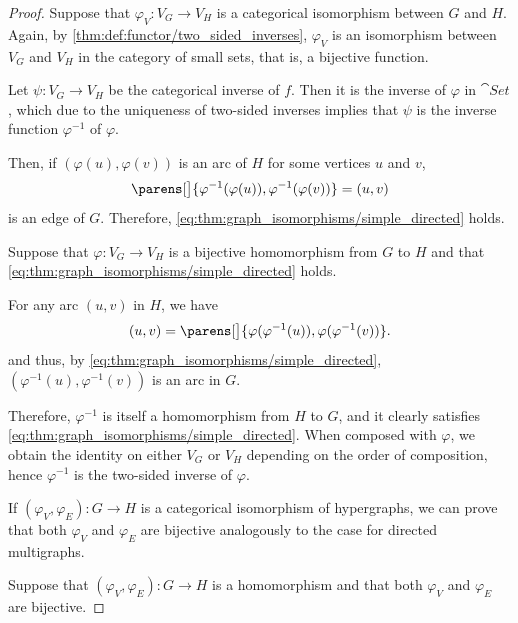 \begin{proof}
  \SufficiencySubProof* Suppose that \( \varphi_V: V_G \to V_H \) is a categorical isomorphism between \( G \) and \( H \). Again, by \cref{thm:def:functor/two_sided_inverses}, \( \varphi_V \) is an isomorphism between \( V_G \) and \( V_H \) in the category of small sets, that is, a bijective function.

  Let \( \psi: V_G \to V_H \) be the categorical inverse of \( f \). Then it is the inverse of \( \varphi \) in \( \cat{Set} \), which due to the uniqueness of two-sided inverses implies that \( \psi \) is the inverse function \( \varphi^{-1} \) of \( \varphi \).

  Then, if \( (\varphi(u), \varphi(v)) \) is an arc of \( H \) for some vertices \( u \) and \( v \),
  \begin{equation*}
    \parens[\big]{ \varphi^{-1}(\varphi(u)), \varphi^{-1}(\varphi(v)) } = (u, v)
  \end{equation*}
  is an edge of \( G \). Therefore, \eqref{eq:thm:graph_isomorphisms/simple_directed} holds.

  \NecessitySubProof* Suppose that \( \varphi: V_G \to V_H \) is a bijective homomorphism from \( G \) to \( H \) and that \eqref{eq:thm:graph_isomorphisms/simple_directed} holds.

  For any arc \( (u, v) \) in \( H \), we have
  \begin{equation*}
    (u, v) = \parens[\big]{ \varphi(\varphi^{-1}(u)), \varphi(\varphi^{-1}(v)) }.
  \end{equation*}
  and thus, by \eqref{eq:thm:graph_isomorphisms/simple_directed}, \( (\varphi^{-1}(u), \varphi^{-1}(v)) \) is an arc in \( G \).

  Therefore, \( \varphi^{-1} \) is itself a homomorphism from \( H \) to \( G \), and it clearly satisfies \eqref{eq:thm:graph_isomorphisms/simple_directed}. When composed with \( \varphi \), we obtain the identity on either \( V_G \) or \( V_H \) depending on the order of composition, hence \( \varphi^{-1} \) is the two-sided inverse of \( \varphi \).


  \SufficiencySubProof* If \( (\varphi_V, \varphi_E): G \to H \) is a categorical isomorphism of hypergraphs, we can prove that both \( \varphi_V \) and \( \varphi_E \) are bijective analogously to the case for directed multigraphs.

  \NecessitySubProof* Suppose that \( (\varphi_V, \varphi_E): G \to H \) is a homomorphism and that both \( \varphi_V \) and \( \varphi_E \) are bijective.


\end{proof}
